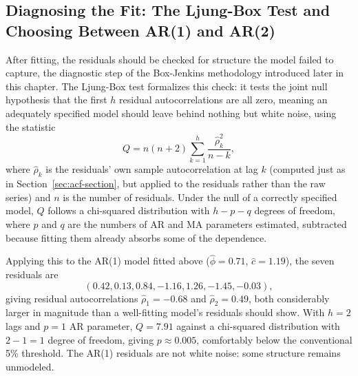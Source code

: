 \documentclass[../ai_in_finance]{subfiles}
\begin{document}
\subsection{Diagnosing the Fit: The Ljung-Box Test and Choosing Between AR(1) and AR(2)}
\label{sec:ljung-box}

After fitting, the residuals should be checked for structure the model failed to capture, the diagnostic step of the Box-Jenkins methodology introduced later in this chapter. The Ljung-Box test formalizes this check: it tests the joint null hypothesis that the first $h$ residual autocorrelations are all zero, meaning an adequately specified model should leave behind nothing but white noise, using the statistic
\begin{equation}
\label{eq:timeseries-ljung-box}
Q = n(n+2)\sum_{k=1}^h \frac{\hat\rho_k^2}{n-k},
\end{equation}
where $\hat\rho_k$ is the residuals' own sample autocorrelation at lag $k$ (computed just as in Section~\ref{sec:acf-section}, but applied to the residuals rather than the raw series) and $n$ is the number of residuals. Under the null of a correctly specified model, $Q$ follows a chi-squared distribution with $h-p-q$ degrees of freedom, where $p$ and $q$ are the numbers of AR and MA parameters estimated, subtracted because fitting them already absorbs some of the dependence.

Applying this to the AR(1) model fitted above ($\hat\phi=0.71$, $\hat c=1.19$), the seven residuals are 
$$(0.42, 0.13, 0.84,-1.16, 1.26, -1.45, -0.03),$$ 
giving residual autocorrelations $\hat\rho_1 = -0.68$ and $\hat\rho_2 = 0.49$, both considerably larger in magnitude than a well-fitting model's residuals should show. With $h=2$ lags and $p=1$ AR parameter, $Q = 7.91$ against a chi-squared distribution with $2-1=1$ degree of freedom, giving $p \approx 0.005$, comfortably below the conventional 5\% threshold.
The AR(1) residuals are not white noise: some structure remains unmodeled.
\end{document}
